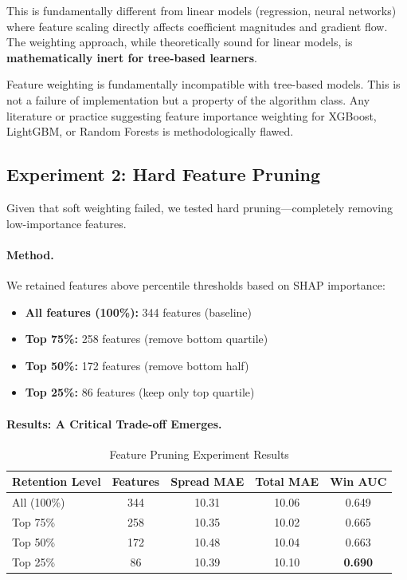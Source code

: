 This is fundamentally different from linear models (regression, neural networks) where feature scaling directly affects coefficient magnitudes and gradient flow. The weighting approach, while theoretically sound for linear models, is \textbf{mathematically inert for tree-based learners}.

\begin{tcolorbox}[colback=blue!5!white,colframe=blue!75!black,title=Key Discovery]
Feature weighting is fundamentally incompatible with tree-based models. This is not a failure of implementation but a property of the algorithm class. Any literature or practice suggesting feature importance weighting for XGBoost, LightGBM, or Random Forests is methodologically flawed.
\end{tcolorbox}

\subsection{Experiment 2: Hard Feature Pruning}

Given that soft weighting failed, we tested hard pruning---completely removing low-importance features.

\paragraph{Method.}
We retained features above percentile thresholds based on SHAP importance:
\begin{itemize}[itemsep=2pt,parsep=0pt]
    \item \textbf{All features (100\%):} 344 features (baseline)
    \item \textbf{Top 75\%:} 258 features (remove bottom quartile)
    \item \textbf{Top 50\%:} 172 features (remove bottom half)
    \item \textbf{Top 25\%:} 86 features (keep only top quartile)
\end{itemize}

\paragraph{Results: A Critical Trade-off Emerges.}

\begin{table}[htbp]
\centering
\caption{Feature Pruning Experiment Results}
\label{tab:feature-pruning-results}
\small
\begin{tabular}{@{} l S[table-format=3.0] S[table-format=2.2] S[table-format=2.2] S[table-format=1.3] @{}}
\toprule
\textbf{Retention Level} & \textbf{Features} & \textbf{Spread MAE} & \textbf{Total MAE} & \textbf{Win AUC} \\
\midrule
All (100\%) & 344 & 10.31 & 10.06 & 0.649 \\
Top 75\% & 258 & 10.35 & 10.02 & 0.665 \\
Top 50\% & 172 & 10.48 & 10.04 & 0.663 \\
Top 25\% & 86 & 10.39 & 10.10 & \textbf{0.690} \\
\bottomrule
\end{tabular}
\end{table}

